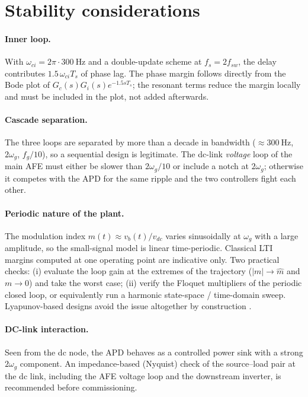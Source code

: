 \documentclass[11pt,a4paper]{article}
\begin{document}
\section{Stability considerations}

\paragraph{Inner loop.} With $\omega_{ci}=2\pi\cdot\SI{300}{\hertz}$ and a
double-update scheme at $f_s=2f_{sw}$, the delay contributes
$1.5\,\omega_{ci}T_s$ of phase lag. The phase margin follows directly from the
Bode plot of $G_c(s)G_i(s)e^{-1.5sT_s}$; the resonant terms reduce the margin
locally and must be included in the plot, not added afterwards.

\paragraph{Cascade separation.} The three loops are separated by more than a
decade in bandwidth ($\approx\SI{300}{\hertz}$, $2\omega_g$, $f_g/10$), so a
sequential design is legitimate. The dc-link \emph{voltage} loop of the main AFE
must either be slower than $2\omega_g/10$ or include a notch at $2\omega_g$;
otherwise it competes with the APD for the same ripple and the two controllers
fight each other.

\paragraph{Periodic nature of the plant.} The modulation index
$m(t)\approx v_b(t)/v_{dc}$ varies sinusoidally at $\omega_g$ with a large
amplitude, so the small-signal model is linear time-periodic. Classical LTI
margins computed at one operating point are indicative only. Two practical
checks: (i) evaluate the loop gain at the extremes of the trajectory
($|m|\to \hat m$ and $m\to 0$) and take the worst case; (ii) verify the Floquet
multipliers of the periodic closed loop, or equivalently run a harmonic
state-space / time-domain sweep. Lyapunov-based designs avoid the issue
altogether by construction \cite{liu2024lyapunov,yuan2019nonlinear}.

\paragraph{DC-link interaction.} Seen from the dc node, the APD behaves as a
controlled power sink with a strong $2\omega_g$ component. An impedance-based
(Nyquist) check of the source--load pair at the dc link, including the AFE
voltage loop and the downstream inverter, is recommended before commissioning.
\end{document}
